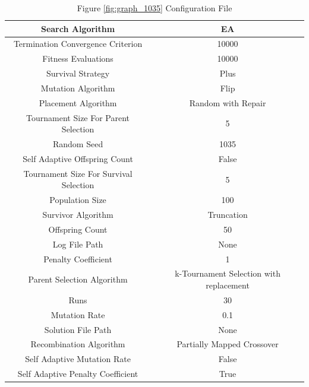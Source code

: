 \documentclass{standalone}
\begin{document}
\begin{table}[!htb]
	\centering
	\caption{Figure \ref{fig:graph_1035} Configuration File}
	\label{tab:graph_1035}
	\begin{tabular}{| c | c |}
		\hline
		Search Algorithm		& EA		 \\
		\hline
		Termination Convergence Criterion		& 10000		 \\
		\hline
		Fitness Evaluations		& 10000		 \\
		\hline
		Survival Strategy		& Plus		 \\
		\hline
		Mutation Algorithm		& Flip		 \\
		\hline
		Placement Algorithm		& Random with Repair		 \\
		\hline
		Tournament Size For Parent Selection		& 5		 \\
		\hline
		Random Seed		& 1035		 \\
		\hline
		Self Adaptive Offspring Count		& False		 \\
		\hline
		Tournament Size For Survival Selection		& 5		 \\
		\hline
		Population Size		& 100		 \\
		\hline
		Survivor Algorithm		& Truncation		 \\
		\hline
		Offspring Count		& 50		 \\
		\hline
		Log File Path		& None		 \\
		\hline
		Penalty Coefficient		& 1		 \\
		\hline
		Parent Selection Algorithm		& k-Tournament Selection with replacement		 \\
		\hline
		Runs		& 30		 \\
		\hline
		Mutation Rate		& 0.1		 \\
		\hline
		Solution File Path		& None		 \\
		\hline
		Recombination Algorithm		& Partially Mapped Crossover		 \\
		\hline
		Self Adaptive Mutation Rate		& False		 \\
		\hline
		Self Adaptive Penalty Coefficient		& True		 \\
		\hline
	\end{tabular}
\end{table}
\end{document}
